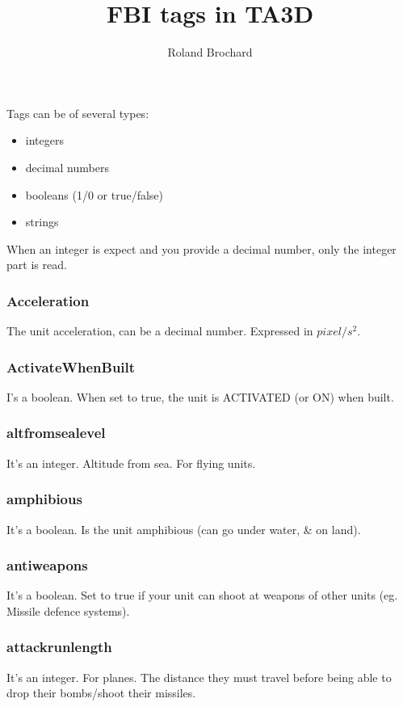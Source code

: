 \documentclass[a4paper,10pt]{article}
\title{FBI tags in TA3D}
\author{Roland Brochard}
\date{}
\begin{document}
\maketitle


\pagebreak

Tags can be of several types:
\begin{itemize}
 \item integers
 \item decimal numbers
 \item booleans (1/0 or true/false)
 \item strings
\end{itemize}
When an integer is expect and you provide a decimal number, only the integer part is read.

\subsubsection{Acceleration}
The unit acceleration, can be a decimal number. Expressed in $pixel/s^2$.

\subsubsection{ActivateWhenBuilt}
I's a boolean. When set to true, the unit is ACTIVATED (or ON) when built.

\subsubsection{altfromsealevel}
It's an integer. Altitude from sea. For flying units.

\subsubsection{amphibious}
It's a boolean.
Is the unit amphibious (can go under water, \& on land).

\subsubsection{antiweapons}
It's a boolean. Set to true if your unit can shoot at weapons of other units (eg. Missile defence systems).

\subsubsection{attackrunlength}
It's an integer.
For planes. The distance they must travel before being able to drop their bombs/shoot their missiles.
\end{document}
